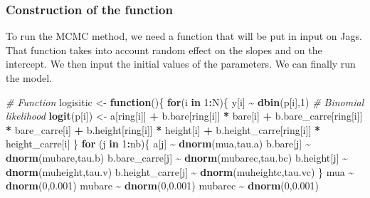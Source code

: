 \documentclass[
]{article}
\newenvironment{Shaded}{\begin{snugshade}}{\end{snugshade}}
\newcommand{\CommentTok}[1]{\textcolor[rgb]{0.56,0.35,0.01}{\textit{#1}}}
\newcommand{\ControlFlowTok}[1]{\textcolor[rgb]{0.13,0.29,0.53}{\textbf{#1}}}
\newcommand{\DecValTok}[1]{\textcolor[rgb]{0.00,0.00,0.81}{#1}}
\newcommand{\FloatTok}[1]{\textcolor[rgb]{0.00,0.00,0.81}{#1}}
\newcommand{\FunctionTok}[1]{\textcolor[rgb]{0.13,0.29,0.53}{\textbf{#1}}}
\newcommand{\NormalTok}[1]{#1}
\newcommand{\OtherTok}[1]{\textcolor[rgb]{0.56,0.35,0.01}{#1}}
\newcommand{\SpecialCharTok}[1]{\textcolor[rgb]{0.81,0.36,0.00}{\textbf{#1}}}
\begin{document}
\subsubsection{Construction of the
function}\label{construction-of-the-function}

To run the MCMC method, we need a function that will be put in input on
Jags. That function takes into account random effect on the slopes and
on the intercept. We then input the initial values of the parameters. We
can finally run the model.

\begin{Shaded}
\begin{Highlighting}[]
\CommentTok{\# Function}
\NormalTok{logisitic }\OtherTok{\textless{}{-}} \ControlFlowTok{function}\NormalTok{()\{}
  \ControlFlowTok{for}\NormalTok{(i }\ControlFlowTok{in} \DecValTok{1}\SpecialCharTok{:}\NormalTok{N)\{}
\NormalTok{    y[i] }\SpecialCharTok{\textasciitilde{}} \FunctionTok{dbin}\NormalTok{(p[i],}\DecValTok{1}\NormalTok{) }\CommentTok{\# Binomial likelihood}
    \FunctionTok{logit}\NormalTok{(p[i]) }\OtherTok{\textless{}{-}}\NormalTok{ a[ring[i]] }\SpecialCharTok{+}\NormalTok{ b.bare[ring[i]] }\SpecialCharTok{*}\NormalTok{ bare[i] }\SpecialCharTok{+}\NormalTok{ b.bare\_carre[ring[i]] }\SpecialCharTok{*}\NormalTok{ bare\_carre[i] }\SpecialCharTok{+}\NormalTok{ b.height[ring[i]] }\SpecialCharTok{*}\NormalTok{ height[i] }\SpecialCharTok{+}\NormalTok{ b.height\_carre[ring[i]] }\SpecialCharTok{*}\NormalTok{ height\_carre[i]}
\NormalTok{  \}}
  \ControlFlowTok{for}\NormalTok{ (j }\ControlFlowTok{in} \DecValTok{1}\SpecialCharTok{:}\NormalTok{nb)\{}
\NormalTok{    a[j] }\SpecialCharTok{\textasciitilde{}} \FunctionTok{dnorm}\NormalTok{(mua,tau.a) }
\NormalTok{    b.bare[j] }\SpecialCharTok{\textasciitilde{}} \FunctionTok{dnorm}\NormalTok{(mubare,tau.b)}
\NormalTok{    b.bare\_carre[j] }\SpecialCharTok{\textasciitilde{}} \FunctionTok{dnorm}\NormalTok{(mubarec,tau.bc)}
\NormalTok{    b.height[j] }\SpecialCharTok{\textasciitilde{}} \FunctionTok{dnorm}\NormalTok{(muheight,tau.v)}
\NormalTok{    b.height\_carre[j] }\SpecialCharTok{\textasciitilde{}} \FunctionTok{dnorm}\NormalTok{(muheightc,tau.vc) }
\NormalTok{  \}}
\NormalTok{mua }\SpecialCharTok{\textasciitilde{}} \FunctionTok{dnorm}\NormalTok{(}\DecValTok{0}\NormalTok{,}\FloatTok{0.001}\NormalTok{) }
\NormalTok{mubare }\SpecialCharTok{\textasciitilde{}} \FunctionTok{dnorm}\NormalTok{(}\DecValTok{0}\NormalTok{,}\FloatTok{0.001}\NormalTok{) }
\NormalTok{mubarec }\SpecialCharTok{\textasciitilde{}} \FunctionTok{dnorm}\NormalTok{(}\DecValTok{0}\NormalTok{,}\FloatTok{0.001}\NormalTok{) }

\end{Highlighting}
\end{Shaded}
\end{document}
